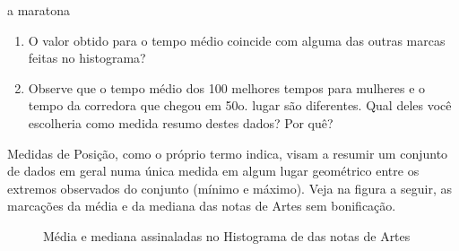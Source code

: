 \begin{task}{ a maratona}
\begin{enumerate}
\item {} 
O valor obtido para o tempo médio coincide com alguma das outras marcas feitas no histograma?

\item {} 
Observe que o tempo médio dos 100 melhores tempos para mulheres e o tempo da  corredora que chegou em 50o. lugar são diferentes. Qual deles você escolheria como medida resumo destes dados? Por quê?

\end{enumerate}
\end{task}


\label{\detokenize{PE104-1:sec-organizando1}}\label{\detokenize{PE104-1::doc}}\label{\detokenize{PE104-1:organizando-as-ideias-medidas-de-posicao}}
Medidas de Posição, como o próprio termo indica, visam a resumir um conjunto de dados em geral numa única medida em algum lugar geométrico entre os extremos observados do conjunto (mínimo e máximo). Veja na figura a seguir, as marcações da média e da mediana das notas de Artes sem bonificação.

\begin{figure}[H]
\centering
\capstart

\caption{Média e mediana assinaladas no Histograma de das notas de Artes}\label{\detokenize{PE104-1:fig-coloque-aqui-o-nome}}\label{\detokenize{PE104-1:id6}}\end{figure}

